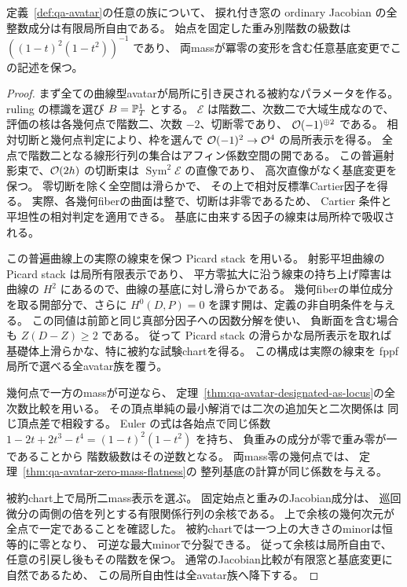 \begin{theorem}[曲線型幾何avatarの全次数平坦性]
\label{thm:qa-avatar-all-jacobian-flatness}
定義~\ref{def:qa-avatar}の任意の族について、
捩れ付き窓の ordinary Jacobian の全整数成分は有限局所自由である。
始点を固定した重み別階数の級数は
$((1-t)^2(1-t^2))^{-1}$ であり、
両massが冪零の変形を含む任意基底変更でこの記述を保つ。
\end{theorem}
\begin{proof}
まず全ての曲線型avatarが局所に引き戻される被約なパラメータを作る。
ruling の標識を選び $B=\mathbb P^1_T$ とする。
$\mathcal E$ は階数二、次数二で大域生成なので、
評価の核は各幾何点で階数二、次数 $-2$、切断零であり、
$\mathcal O(-1)^{\oplus2}$ である。
相対切断と幾何点判定により、枠を選んで
$\mathcal O(-1)^2\to\mathcal O^4$ の局所表示を得る。
全点で階数二となる線形行列の集合はアフィン係数空間の開である。
この普遍射影束で、$\mathcal O(2h)$ の切断束は
$\operatorname{Sym}^2\mathcal E$ の直像であり、
高次直像がなく基底変更を保つ。
零切断を除く全空間は滑らかで、
その上で相対反標準Cartier因子を得る。
実際、各幾何fiberの曲面は整で、切断は非零であるため、
Cartier 条件と平坦性の相対判定を適用できる。
基底に由来する因子の線束は局所枠で吸収される。

この普遍曲線上の実際の線束を保つ Picard stack を用いる。
射影平坦曲線の Picard stack は局所有限表示であり、
平方零拡大に沿う線束の持ち上げ障害は曲線の
$H^2$ にあるので、曲線の基底に対し滑らかである。
幾何fiberの単位成分を取る開部分で、さらに
$H^0(D,P)=0$ を課す開は、定義の非自明条件を与える。
この同値は前節と同じ真部分因子への因数分解を使い、
負断面を含む場合も $Z(D-Z)\geq2$ である。
従って Picard stack の滑らかな局所表示を取れば
基礎体上滑らかな、特に被約な試験chartを得る。
この構成は実際の線束を fppf 局所で選べる全avatar族を覆う。

幾何点で一方のmassが可逆なら、
定理~\ref{thm:qa-avatar-designated-as-locus}の全次数比較を用いる。
その頂点単純の最小解消では二次の追加矢と二次関係は
同じ頂点差で相殺する。
Euler の式は各始点で同じ係数
$1-2t+2t^3-t^4=(1-t)^2(1-t^2)$ を持ち、
負重みの成分が零で重み零が一であることから
階数級数はその逆数となる。
両mass零の幾何点では、
定理~\ref{thm:qa-avatar-zero-mass-flatness}の
整列基底の計算が同じ係数を与える。

被約chart上で局所二mass表示を選ぶ。
固定始点と重みのJacobian成分は、
巡回微分の両側の倍を列とする有限関係行列の余核である。
上で余核の幾何次元が全点で一定であることを確認した。
被約chartでは一つ上の大きさのminorは恒等的に零となり、
可逆な最大minorで分裂できる。
従って余核は局所自由で、任意の引戻し後もその階数を保つ。
通常のJacobian比較が有限窓と基底変更に自然であるため、
この局所自由性は全avatar族へ降下する。
\end{proof}


